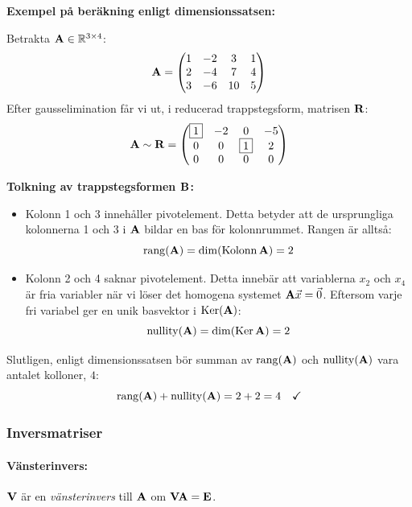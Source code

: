 \begin{ber}
	\textbf{Exempel på beräkning enligt dimensionssatsen:}

	Betrakta $\mathbf{A}\in\mathbb{R}^{3\times 4}$:
	$$
		\mathbf{A}=\qty(\begin{matrix} 
			1&-2&3&1\\ 
			2&-4&7&4\\ 
			3&-6&10&5 
		\end{matrix})
	$$
	Efter gausselimination får vi ut, i reducerad trappstegsform, matrisen $\mathbf{R}$:
	$$
		\mathbf{A}\sim\mathbf{R}=\qty(\begin{matrix} 
			\boxed{1} & -2 & 0 & -5 \\ 
			0 & 0 & \boxed{1} & 2 \\ 
			0 & 0 & 0 & 0 
		\end{matrix})
	$$
	
	\textbf{Tolkning av trappstegsformen $\mathbf{B}$:}
	\begin{itemize}
		\item Kolonn 1 och 3 innehåller pivotelement. Detta betyder att de
		ursprungliga kolonnerna 1 och 3 i $\mathbf{A}$ bildar en bas för kolonnrummet.
		Rangen är alltså:
		$$
			\operatorname{rang}(\mathbf{A})=\dim(\operatorname{Kolonn}\mathbf{A})=2
		$$
		
		\item Kolonn 2 och 4 saknar pivotelement. Detta innebär att variablerna
		$x_2$ och $x_4$ är fria variabler när vi löser det homogena systemet $\mathbf{A}\vec{x}=\vec{0}$.
		Eftersom varje fri variabel ger en unik basvektor i $\operatorname{Ker}(\mathbf{A})$:
		$$
			\operatorname{nullity}(\mathbf{A})=\dim(\operatorname{Ker}\mathbf{A})=2
		$$
	\end{itemize}

	Slutligen, enligt dimensionssatsen bör summan av $\operatorname{rang}(\mathbf{A})$ och
	$\operatorname{nullity}(\mathbf{A})$ vara antalet kolloner, $4$:
	$$
		\operatorname{rang}(\mathbf{A})+\operatorname{nullity}(\mathbf{A})=2+2=4\quad\checkmark
	$$
\end{ber}


\subsubsection{Inversmatriser}

\paragraph{Vänsterinvers:} $\mathbf{V}$ är en \emph{vänsterinvers} till $\mathbf{A}$
om $\mathbf{V}\mathbf{A}=\mathbf{E}$.

